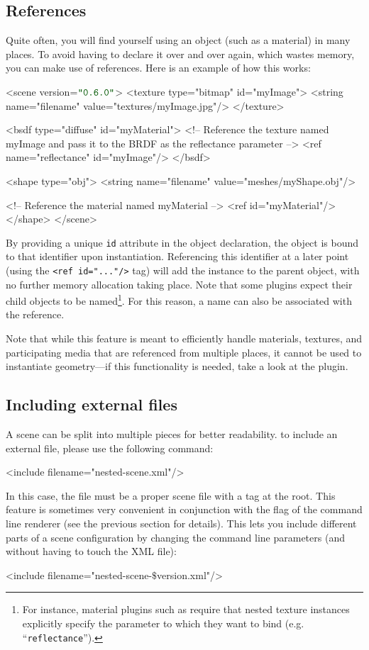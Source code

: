 \subsection{References}
Quite often, you will find yourself using an object (such as a material) in many places. To avoid having
to declare it over and over again, which wastes memory, you can make use of references. Here is an example
of how this works:
\newpage
\begin{xml}
<scene version=$\MtsVer$>
    <texture type="bitmap" id="myImage">
        <string name="filename" value="textures/myImage.jpg"/>
    </texture>

    <bsdf type="diffuse" id="myMaterial">
        <!-- Reference the texture named myImage and pass it
            to the BRDF as the reflectance parameter -->
        <ref name="reflectance" id="myImage"/>
    </bsdf>

    <shape type="obj">
        <string name="filename" value="meshes/myShape.obj"/>

        <!-- Reference the material named myMaterial -->
        <ref id="myMaterial"/>
    </shape>
</scene>
\end{xml}
By providing a unique \texttt{id} attribute in the
object declaration, the object is bound to that identifier
upon instantiation.
Referencing this identifier at a later point (using the \texttt{<ref id="..."/>} tag)
will add the instance to the parent object, with no further memory
allocation taking place. Note that some plugins expect their child objects
to be named\footnote{For instance, material plugins such as  require that
nested texture instances explicitly specify the parameter to which they want to bind (e.g. ``\texttt{reflectance}'').}.
For this reason, a name can also be associated with the reference.

Note that while this feature is meant to efficiently handle materials,
textures, and participating media that are referenced from multiple places,
it cannot be used to instantiate geometry---if this functionality is needed,
take a look at the  plugin.

\subsection{Including external files}
A scene can be split into multiple pieces for better readability.
to include an external file, please use the following command:
\begin{xml}
<include filename="nested-scene.xml"/>
\end{xml}
In this case, the file  must be a proper scene file with a  tag at the root.
This feature is sometimes very convenient in conjunction with the  flag of the  command line renderer (see the previous section for details).
This lets you include different parts of a scene configuration by changing the command line parameters (and without having to touch the XML file):
\begin{xml}
<include filename="nested-scene-$\texttt{\$}$version.xml"/>
\end{xml}
